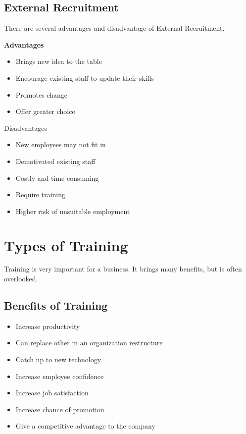 \documentclass{report}
\begin{document}
\subsection{External Recruitment}
There are several advantages and disadvantage of External Recruitment.

\textbf{Advantages}\\
\begin{itemize}
	\item Brings new idea to the table
	\item Encourage existing staff to update their skills
	\item Promotes change
	\item Offer greater choice
\end{itemize}

Disadvantages\\
\begin{itemize}
	\item New employees may not fit in
	\item Demotivated existing staff
	\item Costly and time consuming
	\item Require training
	\item Higher risk of unsuitable employment
\end{itemize}

\section{Types of Training}
Training is very important for a business.
It brings many benefits, but is often overlooked.

\subsection{Benefits of Training}
\begin{itemize}
	\item Increase productivity
	\item Can replace other in an organization restructure
	\item Catch up to new technology
	\item Increase employee confidence
	\item Increase job satisfaction
	\item Increase chance of promotion
	\item Give a competitive advantage to the company
\end{itemize}
\end{document}
